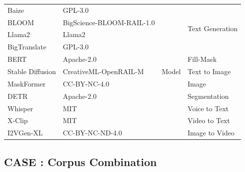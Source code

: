\begin{table}[t]
\begin{tabular}{|p{1.6cm}|p{3cm}|p{0.6cm}|p{1.7cm}|}
        Baize & \textcolor{Copyleft}{GPL-3.0} & \multirow{11}{*}{Model} & \multirow{4}{*}{Text Generation}   \\ \cline{1-2}
        BLOOM & \textcolor{Permissive}{BigScience-BLOOM-RAIL-1.0} & &   \\ \cline{1-2}
        Llama2 & \textcolor{Permissive}{Llama2} & &   \\ \cline{1-2}
        BigTranslate & \textcolor{Copyleft}{GPL-3.0} & &   \\ \cline{1-2} \cline{4-4}

        BERT & \textcolor{Permissive}{Apache-2.0} &  & Fill-Mask   \\ \cline{1-2} \cline{4-4}

        Stable Diffusion & \textcolor{Permissive}{CreativeML-OpenRAIL-M} & & Text to Image  \\ \cline{1-2} \cline{4-4}

        MaskFormer & \textcolor{Permissive}{CC-BY-NC-4.0} & & Image  \\ \cline{1-2}
        DETR & \textcolor{Permissive}{Apache-2.0} & & Segmentation \\ \cline{1-2} \cline{4-4}

        Whisper & \textcolor{Permissive}{MIT} & & Voice to Text  \\ \cline{1-2} \cline{4-4}

        X-Clip & \textcolor{Permissive}{MIT} & & Video to Text  \\ \cline{1-2} \cline{4-4}

        I2VGen-XL & CC-BY-NC-ND-4.0 & & Image to Video  \\ \hline

        \end{tabular}
\end{table}

\subsection{CASE  : Corpus Combination}

